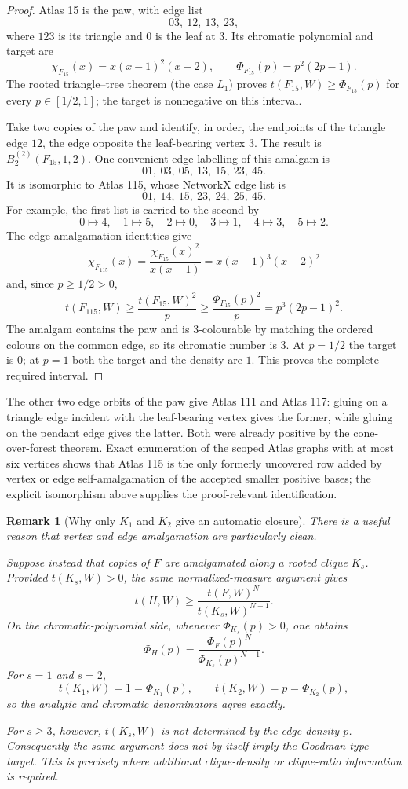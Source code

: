 \documentclass[11pt]{article}
\newtheorem{remark}[theorem]{Remark}
\begin{document}
\begin{proof}
Atlas 15 is the paw, with edge list
\[
  03,\ 12,\ 13,\ 23,
\]
where $123$ is its triangle and $0$ is the leaf at $3$.  Its
chromatic polynomial and target are
\[
  \chi_{F_{15}}(x)=x(x-1)^2(x-2),
  \qquad
  \Phi_{F_{15}}(p)=p^2(2p-1).
\]
The rooted triangle--tree theorem (the case $L_1$) proves
$t(F_{15},W)\geq\Phi_{F_{15}}(p)$ for every $p\in[1/2,1]$; the target
is nonnegative on this interval.

Take two copies of the paw and identify, in order, the endpoints of the
triangle edge $12$, the edge opposite the leaf-bearing vertex $3$.
The result is $B_2^{(2)}(F_{15},1,2)$.  One convenient edge labelling of
this amalgam is
\[
  01,\ 03,\ 05,\ 13,\ 15,\ 23,\ 45.
\]
It is isomorphic to Atlas 115, whose NetworkX edge list is
\[
  01,\ 14,\ 15,\ 23,\ 24,\ 25,\ 45.
\]
For example, the first list is carried to the second by
\[
  0\mapsto4,\quad 1\mapsto5,\quad 2\mapsto0,\quad
  3\mapsto1,\quad 4\mapsto3,\quad 5\mapsto2.
\]
The edge-amalgamation identities give
\[
  \chi_{F_{115}}(x)
  =\frac{\chi_{F_{15}}(x)^2}{x(x-1)}
  =x(x-1)^3(x-2)^2
\]
and, since $p\geq1/2>0$,
\[
  t(F_{115},W)
  \geq\frac{t(F_{15},W)^2}{p}
  \geq\frac{\Phi_{F_{15}}(p)^2}{p}
  =p^3(2p-1)^2.
\]
The amalgam contains the paw and is $3$-colourable by matching the
ordered colours on the common edge, so its chromatic number is $3$.
At $p=1/2$ the target is $0$; at $p=1$ both the target and the density
are $1$.  This proves the complete required interval.
\end{proof}

The other two edge orbits of the paw give Atlas 111 and Atlas 117:
gluing on a triangle edge incident with the leaf-bearing vertex gives
the former, while gluing on the pendant edge gives the latter.  Both
were already positive by the cone-over-forest theorem.  Exact
enumeration of the scoped Atlas graphs with at most six vertices shows
that Atlas 115 is the only formerly uncovered row added by vertex or
edge self-amalgamation of the accepted smaller positive bases; the
explicit isomorphism above supplies the proof-relevant identification.

\begin{remark}[Why only $K_1$ and $K_2$ give an automatic closure]
There is a useful reason that vertex and edge amalgamation are
particularly clean.

Suppose instead that copies of $F$ are amalgamated along a rooted
clique $K_s$. Provided $t(K_s,W)>0$, the same normalized-measure
argument gives
\[
    t(H,W)
    \ge
    \frac{t(F,W)^N}{t(K_s,W)^{N-1}}.
\]
On the chromatic-polynomial side, whenever $\Phi_{K_s}(p)>0$, one obtains
\[
    \Phi_H(p)
    =
    \frac{\Phi_F(p)^N}{\Phi_{K_s}(p)^{N-1}}.
\]
For $s=1$ and $s=2$,
\[
    t(K_1,W)=1=\Phi_{K_1}(p),
    \qquad
    t(K_2,W)=p=\Phi_{K_2}(p),
\]
so the analytic and chromatic denominators agree exactly.

For $s\ge3$, however, $t(K_s,W)$ is not determined by the edge
density $p$. Consequently the same argument does not by itself imply
the Goodman-type target. This is precisely where additional
clique-density or clique-ratio information is required.
\end{remark}
\end{document}
